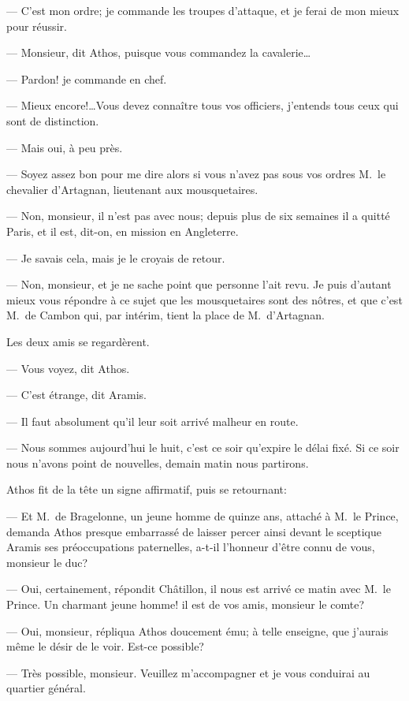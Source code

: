 — C'est mon ordre; je commande les troupes d'attaque, et je ferai de mon mieux pour réussir.

— Monsieur, dit Athos, puisque vous commandez la cavalerie\dots

— Pardon! je commande en chef.

— Mieux encore!\dots Vous devez connaître tous vos officiers, j'entends tous ceux qui sont de distinction.

— Mais oui, à peu près.

— Soyez assez bon pour me dire alors si vous n'avez pas sous vos ordres M.~le chevalier d'Artagnan, lieutenant aux mousquetaires.

— Non, monsieur, il n'est pas avec nous; depuis plus de six semaines il a quitté Paris, et il est, dit-on, en mission en Angleterre.

— Je savais cela, mais je le croyais de retour.

— Non, monsieur, et je ne sache point que personne l'ait revu. Je puis d'autant mieux vous répondre à ce sujet que les mousquetaires sont des nôtres, et que c'est M.~de Cambon qui, par intérim, tient la place de M.~d'Artagnan.

Les deux amis se regardèrent.

— Vous voyez, dit Athos.

— C'est étrange, dit Aramis.

— Il faut absolument qu'il leur soit arrivé malheur en route.

— Nous sommes aujourd'hui le huit, c'est ce soir qu'expire le délai fixé. Si ce soir nous n'avons point de nouvelles, demain matin nous partirons.

Athos fit de la tête un signe affirmatif, puis se retournant:

— Et M.~de Bragelonne, un jeune homme de quinze ans, attaché à M.~le Prince, demanda Athos presque embarrassé de laisser percer ainsi devant le sceptique Aramis ses préoccupations paternelles, a-t-il l'honneur d'être connu de vous, monsieur le duc?

— Oui, certainement, répondit Châtillon, il nous est arrivé ce matin avec M.~le Prince. Un charmant jeune homme! il est de vos amis, monsieur le comte?

— Oui, monsieur, répliqua Athos doucement ému; à telle enseigne, que j'aurais même le désir de le voir. Est-ce possible?

— Très possible, monsieur. Veuillez m'accompagner et je vous conduirai au quartier général.

